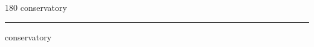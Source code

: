 
\begin{frame}
\begin{center}
\begin{turn}{180}
{\fontsize{2.5cm}{1em}\selectfont conservatory}
\end{turn}
\vspace{1em}\par  
\hrule
\vspace{1em}\par  
{\fontsize{2.5cm}{1em}\selectfont conservatory}
\end{center}
\end{frame}
